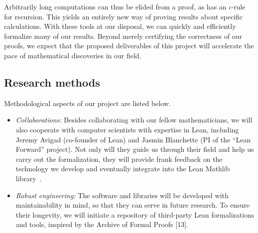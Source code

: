 \documentclass[11pt]{amsart}  %
\begin{document}
Arbitrarily long computations can thus be elided from a proof, as \cic has an $\iota$-rule for recursion. This yields an entirely new way of proving
results about specific calculations. With these tools at our disposal, we can quickly and efficiently formalize many of our results. Beyond merely certifying the correctness of our proofs, we expect that the proposed deliverables of this project will accelerate the pace of mathematical discoveries in our field.




\subsection{Research methods} 
Methodological aspects of our project are listed below.
\begin{itemize}
\item \textsl{Collaborations:} Besides collaborating with our fellow mathematicians, we will also cooperate with computer scientists with expertise in Lean, including Jeremy Avigad (co-founder of Lean) and Jasmin Blanchette (PI of the ``Lean Forward'' project). Not only will they guide us through their field and help us carry out the formalization, they will provide frank feedback on the technology we develop and eventually integrate into the Lean Mathlib library~\cite{lean-mathlib:2018}. 
\item \textsl{Robust engineering:} The software and libraries will be developed with maintainability in mind, so that they can serve in future research. To ensure their longevity, we will initiate a repository of third-party Lean formalizations and tools, inspired by the Archive of Formal Proofs [13].
\end{itemize}
\end{document}
